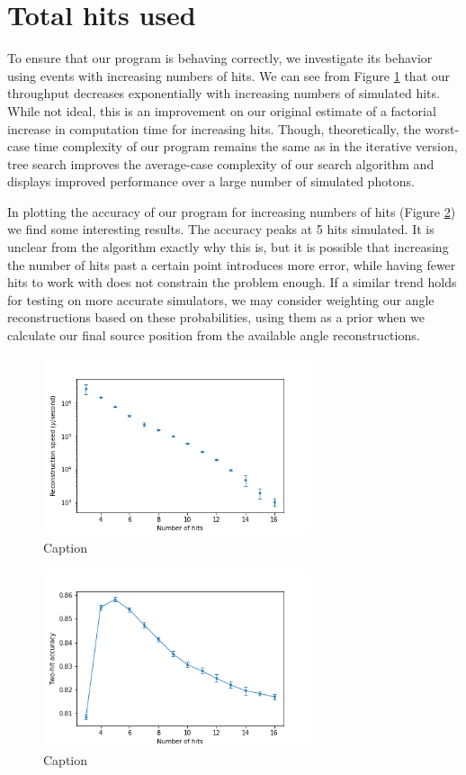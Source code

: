 \section{Total hits used}
To ensure that our program is behaving correctly, we investigate its behavior using events with increasing numbers of hits. We can see from Figure \ref{fig:hits_speed} that our throughput decreases exponentially with increasing numbers of simulated hits. While not ideal, this is an improvement on our original estimate of a factorial increase in computation time for increasing hits. Though, theoretically, the worst-case time complexity of our program remains the same as in the iterative version, tree search improves the average-case complexity of our search algorithm and displays improved performance over a large number of simulated photons.

In plotting the accuracy of our program for increasing numbers of hits (Figure \ref{fig:hits_acc}) we find some interesting results. The accuracy peaks at 5 hits simulated. It is unclear from the algorithm exactly why this is, but it is possible that increasing the number of hits past a certain point introduces more error, while having fewer hits to work with does not constrain the problem enough. If a similar trend holds for testing on more accurate simulators, we may consider weighting our angle reconstructions based on these probabilities, using them as a prior when we calculate our final source position from the available angle reconstructions.

\begin{figure}
    \centering
    \includegraphics[width=0.7\textwidth]{graphs/pi_hits_speed.png}
    \caption{Caption}
    \label{fig:hits_speed}
\end{figure}

\begin{figure}
    \centering
    \includegraphics[width=0.7\textwidth]{graphs/pi_hits_acc.png}
    \caption{Caption}
    \label{fig:hits_acc}
\end{figure}

